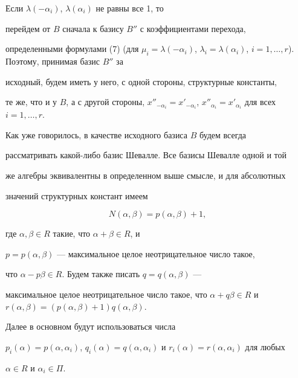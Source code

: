 Если $\lambda(-\alpha_i)$, $\lambda(\alpha_i)$ не равны все 1, то


перейдем от $B$ сначала к базису $B''$ с коэффициентами перехода,


определенными формулами (7) (для $\mu_i=\lambda(-\alpha_i)$, $\lambda_i=


\lambda(\alpha_i)$, $i=1,\dotsc,r$). Поэтому, принимая базис $B''$ за


исходный, будем иметь у него, с одной стороны, структурные константы,


те же, что и у $B$, а с другой стороны, $x''_{-\alpha_i}=


x'_{-\alpha_i}$, $x''_{\alpha_i}=x'_{\alpha_i}$ для всех $i=1,\dotsc,r$.





Как уже говорилось, в качестве исходного базиса $B$ будем всегда


рассматривать какой-либо базис Шевалле. Все базисы Шевалле одной и той


же алгебры эквивалентны в определенном выше смысле, и для абсолютных


значений структурных констант имеем


\begin{equation}


N(\alpha,\beta)=p(\alpha,\beta)+1,


\end{equation}


где $\alpha,\beta\in R$ такие, что $\alpha+\beta\in R$, и


$p=p(\alpha,\beta)$ --- максимальное целое неотрицательное число такое,


что $\alpha-p\beta\in R$. Будем также писать $q=q(\alpha,\beta)$ ---


максимальное целое неотрицательное число такое, что $\alpha+q\beta\in


R$ и $r(\alpha,\beta)=(p(\alpha,\beta)+1)q(\alpha,\beta)$. 


Далее в основном будут использоваться числа


$p_i(\alpha)=p(\alpha,\alpha_i)$, $q_i(\alpha)=


q(\alpha,\alpha_i)$ и $r_i(\alpha)=r(\alpha,\alpha_i)$ для любых


$\alpha\in R$ и $\alpha_i\in\Pi$.





